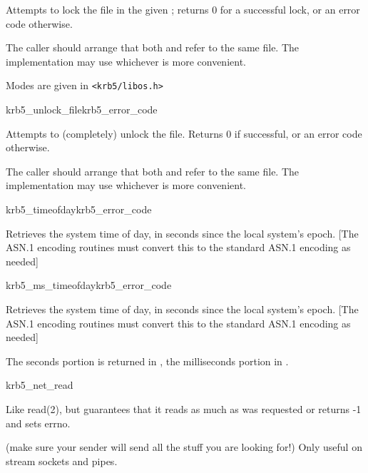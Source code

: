 Attempts to lock the file in the given ; returns 0 for a
successful lock, or an error code otherwise.

The caller should arrange that both  and
 refer to the same
file.  The implementation may use whichever is more convenient.

Modes are given in {\tt <krb5/libos.h>}


\begin{funcdecl}{krb5_unlock_file}{krb5_error_code}{\funcvoid}
\end{funcdecl}

Attempts to (completely) unlock the file.  Returns 0 if successful,
or an error code otherwise.

The caller should arrange that both  and
 refer to the same file.  The implementation may
use whichever is more convenient.

\begin{funcdecl}{krb5_timeofday}{krb5_error_code}{\funcout}
\end{funcdecl}

Retrieves the system time of day, in seconds since the local system's
epoch.
[The ASN.1 encoding routines must convert this to the standard ASN.1
encoding as needed]

\begin{funcdecl}{krb5_ms_timeofday}{krb5_error_code}{\funcout}
\end{funcdecl}

Retrieves the system time of day, in seconds since the local system's
epoch.
[The ASN.1 encoding routines must convert this to the standard ASN.1
encoding as needed]

The seconds portion is returned in , the
milliseconds portion in .

\begin{funcdecl}{krb5_net_read}{\funcin}
\funcout
{}
\funcin
{}
\end{funcdecl}

Like read(2), but guarantees that it reads as much as was requested
or returns -1 and sets errno.

(make sure your sender will send all the stuff you are looking for!)
Only useful on stream sockets and pipes.

